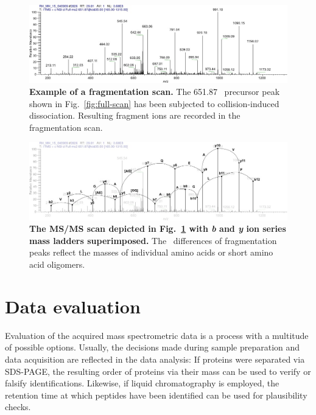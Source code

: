 \begin{figure}[h]
\includegraphics[width=\textwidth]{figures/ms2-scan.jpg}
\caption{
{\bf Example of a fragmentation scan.} 
The 651.87 \mz~precursor peak shown in Fig.~\ref{fig:full-scan} has been
subjected to collision-induced dissociation.
Resulting fragment ions are recorded in the fragmentation scan.
}
\label{fig:fragmentation-scan}
\end{figure}

\begin{figure}[h]
\includegraphics[width=\textwidth]{figures/ms2-scan-b-y-1.jpg}
\caption{
{\bf The MS/MS scan depicted in Fig.~\ref{fig:fragmentation-scan} with {\em b} and 
{\em y} ion series mass ladders superimposed.} 
The \mz~differences of fragmentation peaks reflect the masses of individual amino
acids or short amino acid oligomers.
}
\label{fig:fragmentation-scan-b-y}
\end{figure}


\section{Data evaluation}

Evaluation of the acquired mass spectrometric data is a process with a multitude
of possible options.
Usually, the decisions made during sample preparation and data acquisition are
reflected in the data analysis: If proteins were separated via SDS-PAGE, the
resulting order of proteins via their mass can be used to verify or falsify 
identifications.
Likewise, if liquid chromatography is employed, the retention time at which
peptides have been identified can be used for plausibility checks.

